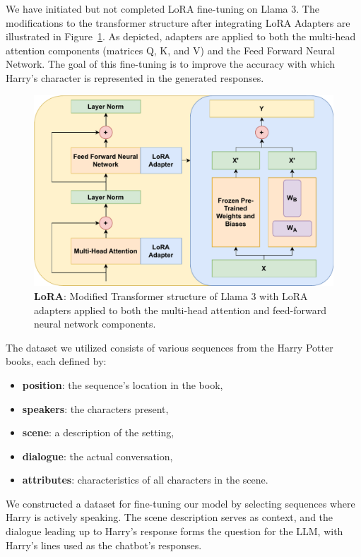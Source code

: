 \documentclass[fleqn,moreauthors,10pt]{ds_report}
\begin{document}
    We have initiated but not completed LoRA fine-tuning on Llama 3. The modifications to the transformer structure after integrating LoRA Adapters are illustrated in Figure~\ref{fig:lora}. As depicted, adapters are applied to both the multi-head attention components (matrices Q, K, and V) and the Feed Forward Neural Network. The goal of this fine-tuning is to improve the accuracy with which Harry's character is represented in the generated responses.

    \begin{figure}[!htb]
            \centering 
    	\includegraphics[width=\linewidth]{fig/lora.drawio.pdf}
    	\caption{\textbf{LoRA}: Modified Transformer structure of Llama 3 with LoRA adapters applied to both the multi-head attention and feed-forward neural network components.}
    	\label{fig:lora}
    \end{figure}

    The dataset we utilized consists of various sequences from the Harry Potter books, each defined by:

    \begin{itemize}
        \item \textbf{position}: the sequence's location in the book,
        \item \textbf{speakers}: the characters present,
        \item \textbf{scene}: a description of the setting,
        \item \textbf{dialogue}: the actual conversation,
        \item \textbf{attributes}: characteristics of all characters in the scene.
    \end{itemize}

    We constructed a dataset for fine-tuning our model by selecting sequences where Harry is actively speaking. The scene description serves as context, and the dialogue leading up to Harry's response forms the question for the LLM, with Harry's lines used as the chatbot's responses.
    
\end{document}
